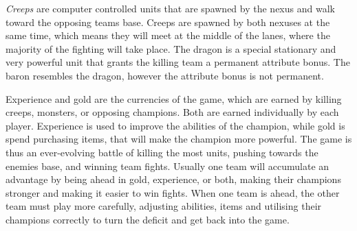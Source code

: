 
\emph{Creeps} are computer controlled units that are spawned by the nexus and walk toward the opposing teams base. Creeps are spawned by both nexuses at the same time, which means they will meet at the middle of the lanes, where the majority of the fighting will take place. The dragon is a special stationary and very powerful unit that grants the killing team a permanent attribute bonus. The baron resembles the dragon, however the attribute bonus is not permanent.

Experience and gold are the currencies of the game, which are earned by killing creeps, monsters, or opposing champions. Both are earned individually by each player. Experience is used to improve the abilities of the champion, while gold is spend purchasing items, that will make the champion more powerful. The game is thus an ever-evolving battle of killing the most units, pushing towards the enemies base, and winning team fights. Usually one team will accumulate an advantage by being ahead in gold, experience, or both, making their champions stronger and making it easier to win fights. When one team is ahead, the other team must play more carefully, adjusting abilities, items and utilising their champions correctly to turn the deficit and get back into the game.

